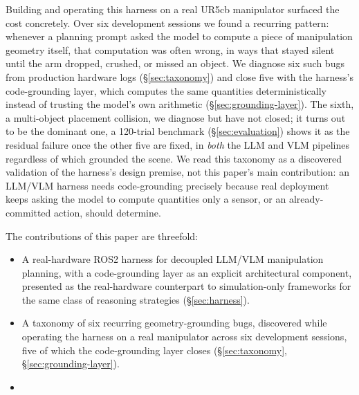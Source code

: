 Building and operating this harness on a real UR5cb manipulator surfaced
the cost concretely. Over six development sessions we found a recurring
pattern: whenever a planning prompt asked the model to compute a piece
of manipulation geometry itself, that computation was often wrong, in
ways that stayed silent until the arm dropped, crushed, or missed an
object. We diagnose six such bugs from production hardware logs
(\S\ref{sec:taxonomy}) and close five with the harness's code-grounding
layer, which computes the same quantities deterministically instead of
trusting the model's own arithmetic (\S\ref{sec:grounding-layer}). The
sixth, a multi-object placement collision, we diagnose but have not
closed; it turns out to be the dominant one, a 120-trial benchmark
(\S\ref{sec:evaluation}) shows it as the residual failure once the other
five are fixed, in \emph{both} the LLM and VLM pipelines regardless of
which grounded the scene. We read this taxonomy as a discovered
validation of the harness's design premise, not this paper's main
contribution: an LLM/VLM harness needs code-grounding precisely because
real deployment keeps asking the model to compute quantities only a
sensor, or an already-committed action, should determine.

The contributions of this paper are threefold:
\begin{itemize}
  \item A real-hardware ROS2 harness for decoupled LLM/VLM manipulation
    planning, with a code-grounding layer as an explicit architectural
    component, presented as the real-hardware counterpart to
    simulation-only frameworks for the same class of reasoning strategies
    (\S\ref{sec:harness}).
  \item A taxonomy of six recurring geometry-grounding bugs, discovered
    while operating the harness on a real manipulator across six
    development sessions, five of which the code-grounding layer closes
    (\S\ref{sec:taxonomy}, \S\ref{sec:grounding-layer}).
  \item {}
\end{itemize}

